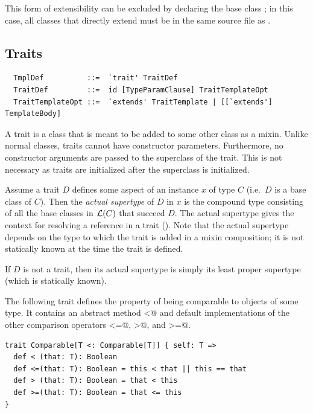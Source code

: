 This form of extensibility can be excluded by declaring the base class
 ; in this case, all classes that
directly extend  must be in the same source file as
.

\subsection{Traits}
\label{sec:traits}

\syntax\begin{lstlisting}
  TmplDef          ::=  `trait' TraitDef
  TraitDef         ::=  id [TypeParamClause] TraitTemplateOpt
  TraitTemplateOpt ::=  `extends' TraitTemplate | [[`extends'] TemplateBody]
\end{lstlisting}

A trait is a class that is meant to be added to some other class
as a mixin. Unlike normal classes, traits cannot have
constructor parameters. Furthermore, no constructor arguments are
passed to the superclass of the trait. This is not necessary as traits are
initialized after the superclass is initialized.

Assume a trait $D$ defines some aspect of an instance $x$ of
type $C$ (i.e.\ $D$ is a base class of $C$). Then the {\em actual
supertype} of $D$ in $x$ is the compound type consisting of all the
base classes in ${\cal L}(C)$ that succeed $D$.  The actual supertype gives
the context for resolving a  reference in a trait
(). Note that the actual supertype depends 
on the type to which the trait is added in a mixin composition; it is not
statically known at the time the trait is defined.

If $D$ is not a trait, then its actual supertype is simply its
least proper supertype (which is statically known).

\example\label{ex:comparable} The following trait defines the property
of being comparable to objects of some type. It contains an abstract
method \lstinline@<@ and default implementations of the other
comparison operators \lstinline@<=@, \lstinline@>@, and
\lstinline@>=@. 

\begin{lstlisting}
trait Comparable[T <: Comparable[T]] { self: T =>
  def < (that: T): Boolean
  def <=(that: T): Boolean = this < that || this == that
  def > (that: T): Boolean = that < this 
  def >=(that: T): Boolean = that <= this
}
\end{lstlisting}

